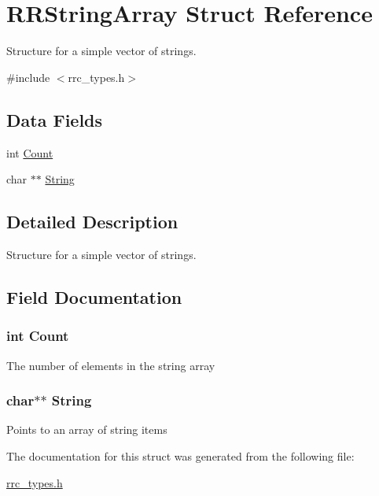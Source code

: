\hypertarget{struct_r_r_string_array}{\section{R\+R\+String\+Array Struct Reference}
\label{struct_r_r_string_array}
}


Structure for a simple vector of strings.  




{\ttfamily \#include $<$rrc\+\_\+types.\+h$>$}

\subsection*{Data Fields}
\begin{DoxyCompactItemize}
\item 
int \hyperlink{struct_r_r_string_array_aad462966ed963f892117056de1eba502}{Count}
\item 
char $\ast$$\ast$ \hyperlink{struct_r_r_string_array_acdbc34377baf3e52d9044aada0f2f511}{String}
\end{DoxyCompactItemize}


\subsection{Detailed Description}
Structure for a simple vector of strings. 

\subsection{Field Documentation}
\hypertarget{struct_r_r_string_array_aad462966ed963f892117056de1eba502}{
\subsubsection[{Count}]{\setlength{\rightskip}{0pt plus 5cm}int Count}}\label{struct_r_r_string_array_aad462966ed963f892117056de1eba502}
The number of elements in the string array \hypertarget{struct_r_r_string_array_acdbc34377baf3e52d9044aada0f2f511}{
\subsubsection[{String}]{\setlength{\rightskip}{0pt plus 5cm}char$\ast$$\ast$ String}}\label{struct_r_r_string_array_acdbc34377baf3e52d9044aada0f2f511}
Points to an array of string items 

The documentation for this struct was generated from the following file\+:\begin{DoxyCompactItemize}
\item 
\hyperlink{rrc__types_8h}{rrc\+\_\+types.\+h}\end{DoxyCompactItemize}
